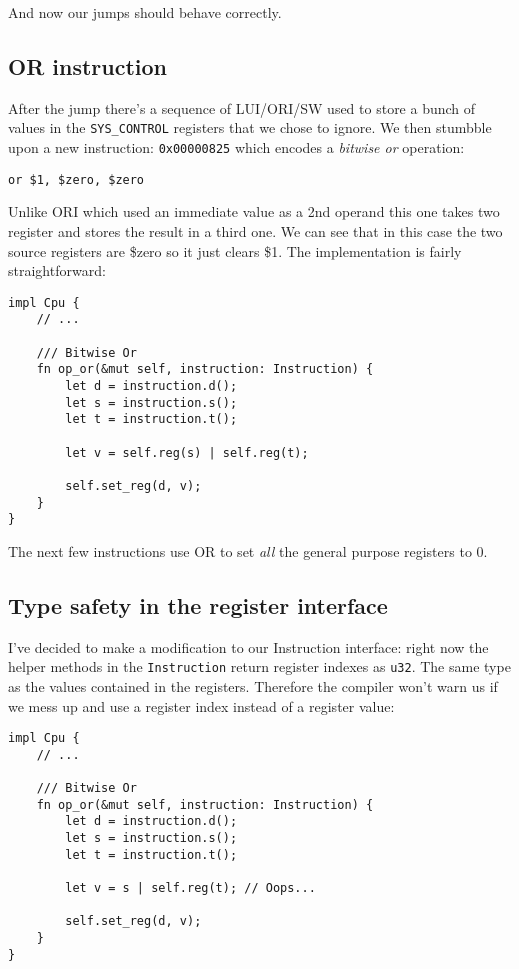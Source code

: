 \documentclass[a4paper]{article}
\newcommand{\code}[1] {\texttt{#1}}
\begin{document}
And now our jumps should behave correctly.

\subsection{OR instruction}

After the jump there's a sequence of LUI/ORI/SW used to store a bunch
of values in the \code{SYS\_CONTROL} registers that we chose to
ignore. We then stumbble upon a new instruction: \code{0x00000825}
which encodes a \emph{bitwise or} operation:

\begin{lstlisting}[language=assembly]
or $1, $zero, $zero
\end{lstlisting}

Unlike ORI which used an immediate value as a 2nd operand this one
takes two register and stores the result in a third one. We can see
that in this case the two source registers are \$zero so it just
clears \$1. The implementation is fairly straightforward:

\begin{lstlisting}
impl Cpu {
    // ...

    /// Bitwise Or
    fn op_or(&mut self, instruction: Instruction) {
        let d = instruction.d();
        let s = instruction.s();
        let t = instruction.t();

        let v = self.reg(s) | self.reg(t);

        self.set_reg(d, v);
    }
}
\end{lstlisting}

The next few instructions use OR to set \emph{all} the general purpose
registers to 0.

\subsection{Type safety in the register interface}

I've decided to make a modification to our Instruction interface:
right now the helper methods in the \code{Instruction} return
register indexes as \code{u32}. The same type as the values
contained in the registers. Therefore the compiler won't warn us if we
mess up and use a register index instead of a register value:

\begin{lstlisting}
impl Cpu {
    // ...

    /// Bitwise Or
    fn op_or(&mut self, instruction: Instruction) {
        let d = instruction.d();
        let s = instruction.s();
        let t = instruction.t();

        let v = s | self.reg(t); // Oops...

        self.set_reg(d, v);
    }
}
\end{lstlisting}
\end{document}

